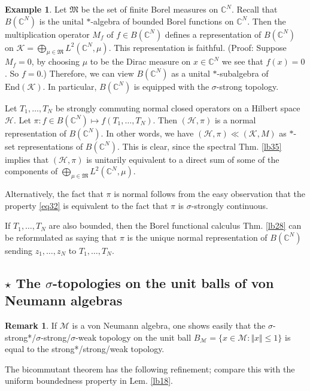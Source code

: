 \documentclass[12pt,b5paper,notitlepage]{article}
\theoremstyle{definition}
\newtheorem{eg}[df]{Example}
\newtheorem{rem}[df]{Remark}
\theoremstyle{plain}
\newcommand{\fk}{\mathfrak}
\newcommand{\mc}{\mathcal}
\newcommand{\End}{\mathrm{End}} %
\newcommand{\Cbb}{\mathbb C}
\numberwithin{equation}{section}
\begin{document}
\begin{eg}\label{lb89}
Let $\fk M$ be the set of finite Borel measures on $\Cbb^N$. Recall that $B(\Cbb^N)$ is the unital $*$-algebra of bounded Borel functions on $\Cbb^N$. Then the multiplication operator $M_f$ of $f\in B(\Cbb^N)$  defines a representation of $B(\Cbb^N)$ on $\mc K=\bigoplus_{\mu\in\fk M}L^2(\Cbb^N,\mu)$. This representation is faithful. (Proof: Suppose $M_f=0$, by choosing $\mu$ to be the Dirac measure on $x\in\Cbb^N$ we see that $f(x)=0$. So $f=0$.) Therefore, we can view $B(\Cbb^N)$ as a unital $*$-subalgebra of $\End(\mc K)$. In particular, $B(\Cbb^N)$ is equipped with the $\sigma$-strong topology.

Let $T_1,\dots,T_N$ be strongly commuting normal closed operators on a Hilbert space $\mc H$. Let $\pi:f\in B(\Cbb^N)\mapsto f(T_1,\dots,T_N)$. Then $(\mc H,\pi)$ is a normal representation of $B(\Cbb^N)$. In other words, we have $(\mc H,\pi)\ll(\mc K,M)$ as $*$-set representations of $B(\Cbb^N)$. This is clear, since the spectral Thm. \ref{lb35} implies that $(\mc H,\pi)$ is unitarily equivalent to a direct sum of some of the components of $\bigoplus_{\mu\in\fk M}L^2(\Cbb^N,\mu)$.

Alternatively, the fact that $\pi$ is normal follows from the easy observation  that the property \eqref{eq32} is equivalent to the fact that $\pi$ is $\sigma$-strongly continuous. 

If $T_1,\dots,T_N$ are also bounded, then the Borel functional calculus Thm. \ref{lb28} can be reformulated as saying that $\pi$ is the unique normal representation of $B(\Cbb^N)$ sending $z_1,\dots,z_N$ to $T_1,\dots,T_N$.  \hfill\qedsymbol
\end{eg}


\subsection*{$\star$ The $\sigma$-topologies on the unit balls of von Neumann algebras}


\begin{rem}
If $\mc M$ is a von Neumann algebra, one shows easily that the $\sigma$-strong*/$\sigma$-strong/$\sigma$-weak topology on the unit ball $B_{\mc M}=\{x\in\mc M:\Vert x\Vert\leq1\}$ is equal to the strong*/strong/weak topology. 
\end{rem}

The bicommutant theorem has the following refinement; compare this with the uniform boundedness property in Lem. \ref{lb18}.
\end{document}
